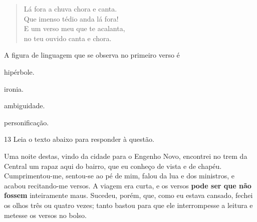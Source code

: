 \begin{myquote}



\begin{verse}

Lá fora a chuva chora e canta. \\
Que imenso tédio anda lá fora! \\
E um verso meu que te acalanta, \\
no teu ouvido canta e chora.


\end{verse}

\end{myquote}

A figura de linguagem que se observa no primeiro verso é

\begin{escolha}

    \item hipérbole. 

    \item ironia. 

    \item ambiguidade. 

    \item personificação. 

\end{escolha}

\num{13} Leia o texto abaixo para responder à questão. 

\begin{myquote}

Uma noite destas, vindo da cidade para o Engenho
Novo, encontrei no trem da Central um rapaz aqui do
bairro, que eu conheço de vista e de chapéu. 
Cumprimentou-me, sentou-se ao pé de mim, falou da lua
e dos ministros, e acabou recitando-me versos. A viagem 
era curta, e os versos \textbf{pode ser que não fossem} 
inteiramente maus. Sucedeu, porém, que, como eu estava 
cansado, fechei os olhos três ou quatro vezes; tanto 
bastou para que ele interrompesse a leitura e metesse 
os versos no bolso.


\end{myquote}

